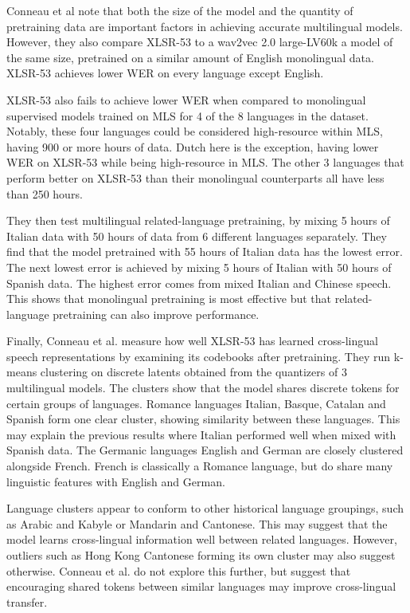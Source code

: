 Conneau et al \cite{XLSR-53} note that both the size of the model and the quantity of pretraining data are important factors in achieving accurate multilingual models. However, they also compare XLSR-53 to a wav2vec 2.0 large-LV60k \cite{wav2vec, librilight} a model of the same size, pretrained on a similar amount of English monolingual data. XLSR-53 achieves lower WER on every language except English. 

XLSR-53 also fails to achieve lower WER when compared to monolingual supervised models trained on MLS for 4 of the 8 languages in the dataset. Notably, these four languages could be considered high-resource within MLS, having 900 or more hours of data. Dutch here is the exception, having lower WER on XLSR-53 while being high-resource in MLS. The other 3 languages that perform better on XLSR-53 than their monolingual counterparts all have less than 250 hours.

They then test multilingual related-language pretraining, by mixing 5 hours of Italian data with 50 hours of data from 6 different languages separately. They find that the model pretrained with 55 hours of Italian data has the lowest error. The next lowest error is achieved by mixing 5 hours of Italian with 50 hours of Spanish data. The highest error comes from mixed Italian and Chinese speech. This shows that monolingual pretraining is most effective but that related-language pretraining can also improve performance. 

Finally, Conneau et al. \cite{XLSR-53} measure how well XLSR-53 has learned cross-lingual speech representations by examining its codebooks after pretraining. They run k-means clustering on discrete latents obtained from the quantizers of 3 multilingual models. The clusters show that the model shares discrete tokens for certain groups of languages. Romance languages Italian, Basque, Catalan and Spanish form one clear cluster, showing similarity between these languages. This may explain the previous results where Italian performed well when mixed with Spanish data. The Germanic languages English and German are closely clustered alongside French. French is classically a Romance language, but do share many linguistic features with English and German.

Language clusters appear to conform to other historical language groupings, such as Arabic and Kabyle or Mandarin and Cantonese. This may suggest that the model learns cross-lingual information well between related languages. However, outliers such as Hong Kong Cantonese forming its own cluster may also suggest otherwise. Conneau et al. \cite{XLSR-53} do not explore this further, but suggest that encouraging shared tokens between similar languages may improve cross-lingual transfer.


